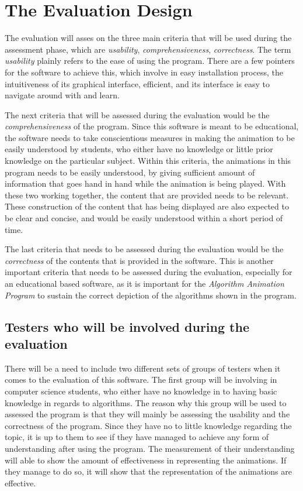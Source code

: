 \section{The Evaluation Design}


The evaluation will asses on the three main criteria that will be used during the assessment phase, which are \textit{usability}, \textit{comprehensiveness}, \textit{correctness}. The term \textit{usability} plainly refers to the ease of using the program. There are a few pointers for the software to achieve this, which involve in easy installation process, the intuitiveness of its graphical interface, efficient, and its interface is easy to navigate around with and learn.

The next criteria that will be assessed during the evaluation would be the \textit{comprehensiveness} of the program. Since this software is meant to be educational, the software needs to take conscientious measures in making the animation to be easily understood by students, who either have no knowledge or little prior knowledge on the particular subject. Within this criteria, the animations in this program needs to be easily understood, by giving sufficient amount of information that goes hand in hand while the animation is being played. With these two working together, the content that are provided needs to be relevant. These construction of the content that has being displayed are also expected to be clear and concise, and would be easily understood within a short period of time. 

The last criteria that needs to be assessed during the evaluation would be the \textit{correctness} of the contents that is provided in the software. This is another important criteria that needs to be assessed during the evaluation, especially for an educational based software, as it is important for the \textit{Algorithm Animation Program} to sustain the correct depiction of the algorithms shown in the program. 

\subsection{Testers who will be involved during the evaluation}
There will be a need to include two different sets of groups of testers when it comes to the evaluation of this software. The first group will be involving in computer science students, who either have no knowledge in to having basic knowledge in regards to algorithms. The reason why this group will be used to assessed the program is that they will mainly be assessing the usability and the correctness of the program. Since they have no to little knowledge regarding the topic, it is up to them to see if they have managed to achieve any form of understanding after using the program. The measurement of their understanding will able to show the amount of effectiveness in representing the animations. If they manage to do so, it will show that the representation of the animations are effective.

